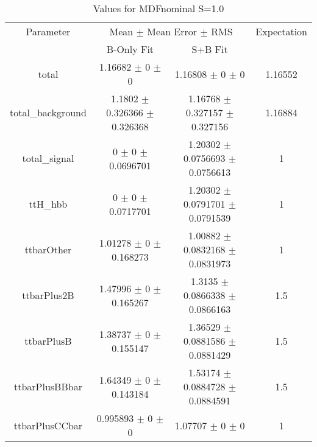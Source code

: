 \begin{table}
\centering
\caption{Values for MDFnominal S=1.0}
\begin{tabular}{cccc}
\toprule
Parameter & \multicolumn{2}{c}{Mean $\pm$ Mean Error $\pm$ RMS} & Expectation\\
 & B-Only Fit & S+B Fit & \\
\midrule
total & \num{1.16682} $\pm$ \num{0} $\pm$ \num{0} & \num{1.16808} $\pm$ \num{0} $\pm$ \num{0} & \num{1.16552}\\
total\_background & \num{1.1802} $\pm$ \num{0.326366} $\pm$ \num{0.326368} & \num{1.16768} $\pm$ \num{0.327157} $\pm$ \num{0.327156} & \num{1.16884}\\
total\_signal & \num{0} $\pm$ \num{0} $\pm$ \num{0.0696701} & \num{1.20302} $\pm$ \num{0.0756693} $\pm$ \num{0.0756613} & \num{1}\\
ttH\_hbb & \num{0} $\pm$ \num{0} $\pm$ \num{0.0717701} & \num{1.20302} $\pm$ \num{0.0791701} $\pm$ \num{0.0791539} & \num{1}\\
ttbarOther & \num{1.01278} $\pm$ \num{0} $\pm$ \num{0.168273} & \num{1.00882} $\pm$ \num{0.0832168} $\pm$ \num{0.0831973} & \num{1}\\
ttbarPlus2B & \num{1.47996} $\pm$ \num{0} $\pm$ \num{0.165267} & \num{1.3135} $\pm$ \num{0.0866338} $\pm$ \num{0.0866163} & \num{1.5}\\
ttbarPlusB & \num{1.38737} $\pm$ \num{0} $\pm$ \num{0.155147} & \num{1.36529} $\pm$ \num{0.0881586} $\pm$ \num{0.0881429} & \num{1.5}\\
ttbarPlusBBbar & \num{1.64349} $\pm$ \num{0} $\pm$ \num{0.143184} & \num{1.53174} $\pm$ \num{0.0884728} $\pm$ \num{0.0884591} & \num{1.5}\\
ttbarPlusCCbar & \num{0.995893} $\pm$ \num{0} $\pm$ \num{0} & \num{1.07707} $\pm$ \num{0} $\pm$ \num{0} & \num{1}\\
\bottomrule
\end{tabular}
\end{table}